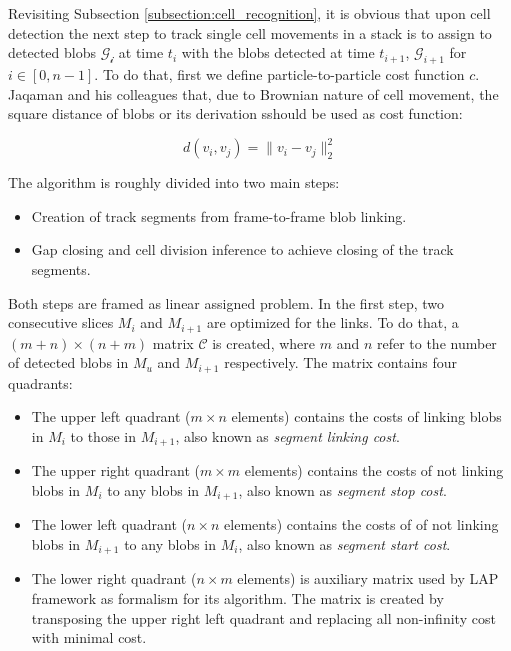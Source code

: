 \documentclass[pdftex,12pt,a4paper]{report}
\begin{document}
Revisiting Subsection \ref{subsection:cell_recognition}, it is obvious that upon cell  detection the next step to track single cell movements in a stack is to assign to detected blobs $\mathcal{G_i}$ at time $t_i$ with the blobs detected at time $t_{i + 1}$, $\mathcal{G}_{i + 1}$ for $i \in [0, n - 1]$. To do that, first we define particle-to-particle cost function $c$. Jaqaman and his colleagues \cite{jaqaman2008robust} that, due to Brownian nature of cell movement, the square distance of blobs or its derivation sshould be used as cost function: 

\begin{equation}
d(v_i, v_j) = \| v_i - v_j\|^2_2
\label{eq:particle_cost_function}
\end{equation}

The algorithm is roughly divided into two main steps:

\begin{itemize}
\item  Creation of track segments from frame-to-frame blob linking.
\item  Gap closing and cell division inference to achieve closing of the track segments.
\end{itemize}

Both steps are framed as linear assigned problem. In the first step, two consecutive slices $M_i$  and $M_{i+1}$ are optimized for the links. To do that, a $(m + n) \times (n + m)$ matrix $\mathcal{C}$ is created, where $m$ and $n$ refer to the number of detected blobs in $M_u$ and $M_{i + 1}$ respectively. The matrix contains four quadrants:

\begin{itemize}
\item The upper left quadrant ($m \times n$ elements) contains the costs of linking blobs in $M_i$ to those in $M_{i + 1}$, also known as \textit{segment linking cost}.
\item The upper right quadrant ($m \times m$ elements) contains the costs of not linking blobs in $M_i$ to any blobs in $M_{i + 1}$, also known as \textit{segment stop cost}.
\item The lower left quadrant ($n \times n$ elements) contains the costs of of not linking blobs in $M_{i + 1}$ to any blobs in $M_i$, also known as \textit{segment start cost}.
\item The lower right quadrant ($n \times m$ elements) is auxiliary matrix used by LAP framework as formalism for its algorithm. The matrix is created by transposing the upper right left quadrant and replacing all non-infinity cost with minimal cost. 
\end{itemize}
\end{document}
